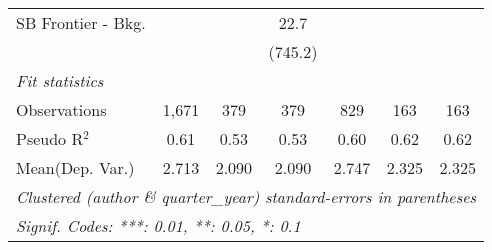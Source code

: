 \begin{tabular}{lcccccc}
   SB Frontier - Bkg.           &                &              & 22.7        &                &             &   \\   
                                &                &              & (745.2)     &                &             &   \\   
   \midrule
   \emph{Fit statistics}\\
   Observations                 & 1,671          & 379          & 379         & 829            & 163         & 163\\  
   Pseudo R$^2$                 & 0.61           & 0.53         & 0.53        & 0.60           & 0.62        & 0.62\\  
Mean(Dep. Var.) & 2.713 & 2.090 & 2.090 & 2.747 & 2.325 & 2.325 \\
   \midrule \midrule
   \multicolumn{7}{l}{\emph{Clustered (author \& quarter\_year) standard-errors in parentheses}}\\
   \multicolumn{7}{l}{\emph{Signif. Codes: ***: 0.01, **: 0.05, *: 0.1}}\\
\end{tabular}
\par\endgroup
